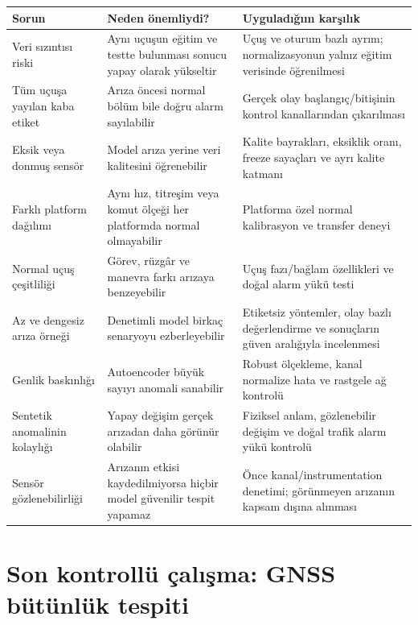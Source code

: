 \documentclass[11pt,a4paper]{article}
\begin{document}
\begin{longtable}{p{}p{}p{}}
\toprule
\textbf{Sorun} & \textbf{Neden önemliydi?} & \textbf{Uyguladığım karşılık} \\
\midrule
\endhead
Veri sızıntısı riski &
Aynı uçuşun eğitim ve testte bulunması sonucu yapay olarak yükseltir &
Uçuş ve oturum bazlı ayrım; normalizasyonun yalnız eğitim verisinde öğrenilmesi \\

Tüm uçuşa yayılan kaba etiket &
Arıza öncesi normal bölüm bile doğru alarm sayılabilir &
Gerçek olay başlangıç/bitişinin kontrol kanallarından çıkarılması \\

Eksik veya donmuş sensör &
Model arıza yerine veri kalitesini öğrenebilir &
Kalite bayrakları, eksiklik oranı, freeze sayaçları ve ayrı kalite katmanı \\

Farklı platform dağılımı &
Aynı hız, titreşim veya komut ölçeği her platformda normal olmayabilir &
Platforma özel normal kalibrasyon ve transfer deneyi \\

Normal uçuş çeşitliliği &
Görev, rüzgâr ve manevra farkı arızaya benzeyebilir &
Uçuş fazı/bağlam özellikleri ve doğal alarm yükü testi \\

Az ve dengesiz arıza örneği &
Denetimli model birkaç senaryoyu ezberleyebilir &
Etiketsiz yöntemler, olay bazlı değerlendirme ve sonuçların güven aralığıyla incelenmesi \\

Genlik baskınlığı &
Autoencoder büyük sayıyı anomali sanabilir &
Robust ölçekleme, kanal normalize hata ve rastgele ağ kontrolü \\

Sentetik anomalinin kolaylığı &
Yapay değişim gerçek arızadan daha görünür olabilir &
Fiziksel anlam, gözlenebilir değişim ve doğal trafik alarm yükü kontrolü \\

Sensör gözlenebilirliği &
Arızanın etkisi kaydedilmiyorsa hiçbir model güvenilir tespit yapamaz &
Önce kanal/instrumentation denetimi; görünmeyen arızanın kapsam dışına alınması \\
\bottomrule
\end{longtable}

\section{Son kontrollü çalışma: GNSS bütünlük tespiti}
\end{document}
